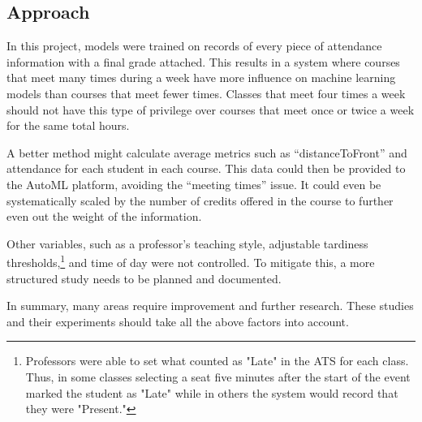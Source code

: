 \subsection{Approach}
In this project, models were trained on records of every piece of attendance information with a final grade attached. This results in a system where courses that meet many times during a week have more influence on machine learning models than courses that meet fewer times. Classes that meet four times a week should not have this type of privilege over courses that meet once or twice a week for the same total hours.

A better method might calculate average metrics such as ``distanceToFront'' and attendance for each student in each course. This data could then be provided to the AutoML platform, avoiding the ``meeting times'' issue. It could even be systematically scaled by the number of credits offered in the course to further even out the weight of the information.

Other variables, such as a professor's teaching style, adjustable tardiness thresholds,\footnote{Professors were able to set what counted as "Late" in the ATS for each class. Thus, in some classes selecting a seat five minutes after the start of the event marked the student as "Late" while in others the system would record that they were "Present."} and time of day were not controlled. To mitigate this, a more structured study needs to be planned and documented.

In summary, many areas require improvement and further research. These studies and their experiments should take all the above factors into account.
